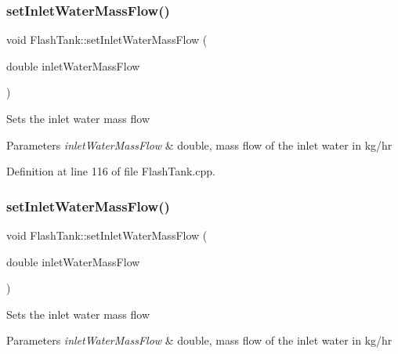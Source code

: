 \subsubsection{\texorpdfstring{set\+Inlet\+Water\+Mass\+Flow()}{setInletWaterMassFlow()}\hspace{0.1cm}{\footnotesize\ttfamily [2/3]}}
{\footnotesize\ttfamily void Flash\+Tank\+::set\+Inlet\+Water\+Mass\+Flow (\begin{DoxyParamCaption}\item[{double}]{inlet\+Water\+Mass\+Flow }\end{DoxyParamCaption})}

Sets the inlet water mass flow 
\begin{DoxyParams}{Parameters}
{\em inlet\+Water\+Mass\+Flow} & double, mass flow of the inlet water in kg/hr \\
\hline
\end{DoxyParams}


Definition at line 116 of file Flash\+Tank.\+cpp.

\mbox{\label{class_flash_tank_a2bcbd92d39ef3c760bdd65066ba3d34a}} 
\subsubsection{\texorpdfstring{set\+Inlet\+Water\+Mass\+Flow()}{setInletWaterMassFlow()}\hspace{0.1cm}{\footnotesize\ttfamily [3/3]}}
{\footnotesize\ttfamily void Flash\+Tank\+::set\+Inlet\+Water\+Mass\+Flow (\begin{DoxyParamCaption}\item[{double}]{inlet\+Water\+Mass\+Flow }\end{DoxyParamCaption})}

Sets the inlet water mass flow 
\begin{DoxyParams}{Parameters}
{\em inlet\+Water\+Mass\+Flow} & double, mass flow of the inlet water in kg/hr \\
\hline
\end{DoxyParams}
\mbox{\label{class_flash_tank_aed0991a7902401d110fb2f4b472326f5}} 
